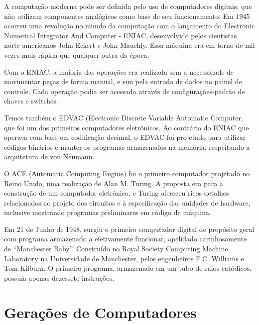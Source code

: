 \documentclass[
	12pt,				%
	openright,			%
	twoside,			%
	a4paper,			%
	english,			%
	french,				%
	spanish,			%
	brazil,				%
	]{abntex2}
\begin{document}
A computação moderna pode ser definida pelo uso de computadores digitais, que não utilizam componentes analógicos como base de seu funcionamento. Em 1945 ocorreu uma revolução no mundo da computação com o lançamento do Electronic Numerical Integrator And Computer - ENIAC, desenvolvido pelos cientistas norte-americanos John Eckert e John Mauchly. Essa máquina era em torno de mil vezes mais rápida que qualquer outra da época.
\par
Com o ENIAC, a maioria das operações era realizada sem a necessidade de movimentar peças de forma manual, e sim pela entrada de dados no painel de controle. Cada operação podia ser acessada através de configurações-padrão de chaves e switches.
\par
Temos também o EDVAC (Electronic Discrete Variable Automatic Computer, que foi um dos primeiros computadores eletrônicos. Ao contrário do ENIAC que operava com base em codificação decimal, o EDVAC foi projetado para utilizar códigos binários e manter os programas armazenados na memória, respeitando a arquitetura de von Neumann.
\par
O ACE (Automatic Computing Engine) foi o primeiro computador projetado no Reino Unido, uma realização de Alan M. Turing. A proposta era para a construção de um computador eletrônico, e Turing ofereceu ricos detalhes relacionados ao projeto dos circuitos e à especificação das unidades de hardware, inclusive mostrando programas preliminares em código de máquina.
\par
Em 21 de Junho de 1948, surgiu o primeiro computador digital de propósito geral com programa armazenado a efetivamente funcionar, apelidado carinhosamente de “Manchester Baby”.  Construído no Royal Society Computing Machine Laboratory na Universidade de Manchester, pelos engenheiros F.C. Williams e Tom Kilburn.  O primeiro programa, armazenado em um tubo de raios catódicos, possuía apenas dezessete instruções.


\chapter{Gerações de Computadores}
\end{document}
